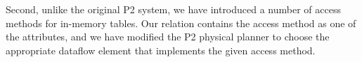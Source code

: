 Second, unlike the original P2
system, we have introduced a number of access methods for in-memory
tables. Our  relation contains the access method as one of
the attributes, and we have modified the P2 physical planner to choose
the appropriate dataflow element that implements the given access
method. 




